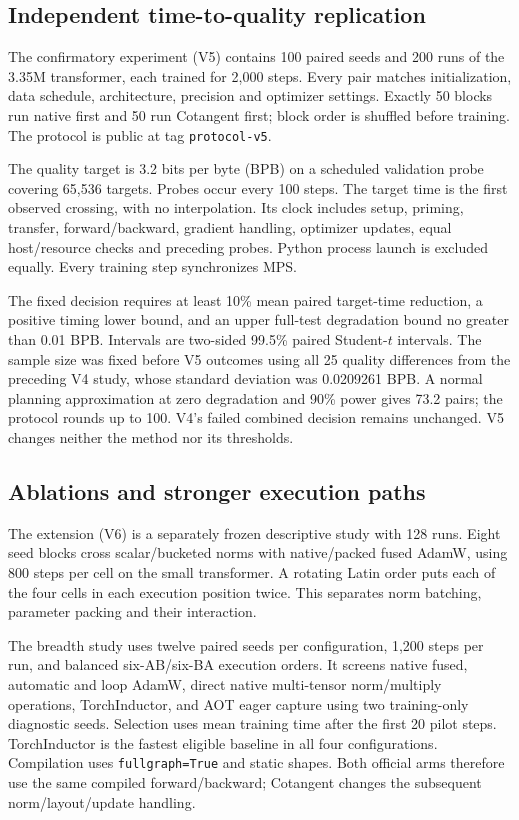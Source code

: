 \documentclass[11pt]{article}
\newcommand{\code}[1]{\texttt{#1}}
\begin{document}
\subsection{Independent time-to-quality replication}
The confirmatory experiment (V5) contains 100 paired seeds and 200 runs of the
3.35M transformer, each trained for 2,000 steps. Every pair matches
initialization, data schedule, architecture, precision and optimizer settings.
Exactly 50 blocks run native first and 50 run Cotangent first; block order is
shuffled before training. The protocol is public at tag \code{protocol-v5}.

The quality target is 3.2 bits per byte (BPB) on a scheduled validation probe
covering 65,536 targets. Probes occur every 100 steps. The target time is the
first observed crossing, with no interpolation. Its clock includes setup,
priming, transfer, forward/backward, gradient handling, optimizer updates,
equal host/resource checks and preceding probes. Python process launch is
excluded equally. Every training step synchronizes MPS.

The fixed decision requires at least 10\% mean paired target-time reduction,
a positive timing lower bound, and an upper full-test degradation bound no
greater than 0.01 BPB. Intervals are two-sided 99.5\% paired Student-$t$
intervals. The sample size was fixed before V5 outcomes using all 25 quality
differences from the preceding V4 study, whose standard deviation was
0.0209261 BPB. A normal planning approximation at zero degradation and 90\%
power gives 73.2 pairs; the protocol rounds up to 100. V4's failed combined
decision remains unchanged. V5 changes neither the method nor its thresholds.

\subsection{Ablations and stronger execution paths}
The extension (V6) is a separately frozen descriptive study with 128 runs.
Eight seed blocks cross scalar/bucketed norms with native/packed fused AdamW,
using 800 steps per cell on the small transformer. A rotating Latin order puts
each of the four cells in each execution position twice. This separates norm
batching, parameter packing and their interaction.

The breadth study uses twelve paired seeds per configuration, 1,200 steps per
run, and balanced six-AB/six-BA execution orders. It screens native fused,
automatic and loop AdamW, direct native multi-tensor norm/multiply operations,
TorchInductor, and AOT eager capture using two training-only diagnostic seeds.
Selection uses mean training time after the first 20 pilot steps.
TorchInductor is the fastest eligible baseline in all four configurations.
Compilation uses \code{fullgraph=True} and static shapes. Both official arms
therefore use the same compiled forward/backward; Cotangent changes the
subsequent norm/layout/update handling.
\end{document}

